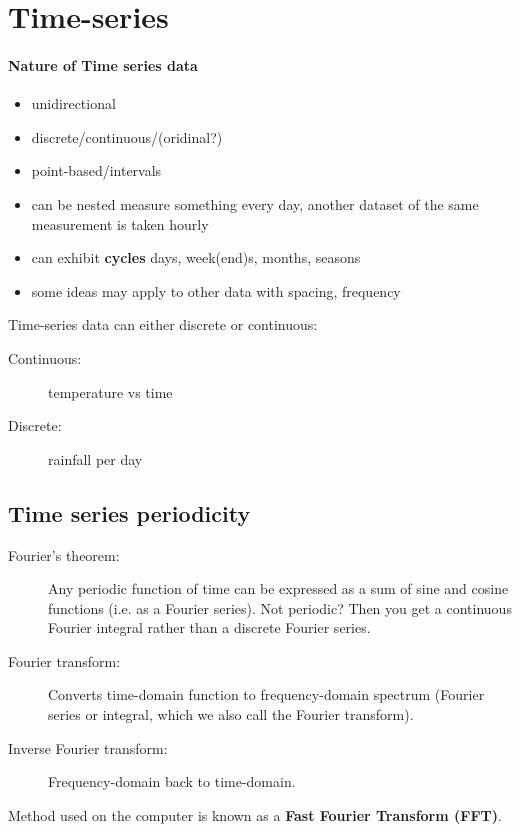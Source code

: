 \section{Time-series}
\paragraph{Nature of Time series data}
\begin{itemize}
	\item unidirectional
	\item discrete/continuous/(oridinal?)
	\item point-based/intervals
	\item can be nested
	\subitem measure something every day, another dataset of the same measurement is taken hourly
	\item can exhibit \textbf{cycles}
	\subitem days, week(end)s, months, seasons
	\item some ideas may apply to other data with spacing, frequency	
\end{itemize}
Time-series data can either discrete or continuous:
\begin{description}
	\item[Continuous:] temperature vs time
	\item[Discrete:] rainfall per day
\end{description}

\subsection{Time series periodicity}
\begin{description}
	\item[Fourier's theorem:] Any periodic function of time can be expressed as a sum of sine and cosine functions (i.e. as a Fourier series). Not periodic? Then you get a continuous Fourier integral rather than a discrete Fourier series.
	\item[Fourier transform:] Converts time-domain function to frequency-domain spectrum (Fourier series or integral, which we also call the Fourier transform).
	\item[Inverse Fourier transform:] Frequency-domain back to time-domain.
\end{description}
Method used on the computer is known as a \textbf{Fast Fourier Transform (FFT)}.